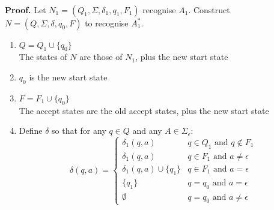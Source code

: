\documentclass{article}
\begin{document}
\\\textbf{Proof.} Let $N_1 = (Q_1, \Sigma, \delta_1, q_1, F_1)$ recognise $A_1$. Construct $N = (Q, \Sigma, \delta, q_0, F)$ to recognise $A_1^*$.
\begin{enumerate}
	\item $Q = Q_1 \cup \{q_0\}$
	\\ The states of $N$ are those of $N_1$, plus the new start state
	\item $q_0$ is the new start state
	\item $F = F_1 \cup \{q_0\}$
	\\ The accept states are the old accept states, plus the new start state
	\item Define $\delta$ so that for any $q \in Q$ and any $A \in \Sigma_{\epsilon}$:
	\begin{equation*}
		\delta(q, a) = \begin{cases}
			\delta_1(q, a) & q \in Q_1 \text{ and } q \notin F_1\\
			\delta_1(q, a) & q \in F_1 \text{ and } a \neq \epsilon\\
			\delta_1(q, a) \cup \{q_1\} & q \in F_1 \text{ and } a = \epsilon\\
			\{q_1\} & q = q_0 \text{ and } a = \epsilon\\
			\emptyset & q = q_0 \text{ and } a \neq \epsilon
		\end{cases}
	\end{equation*}
\end{enumerate}
\end{document}
